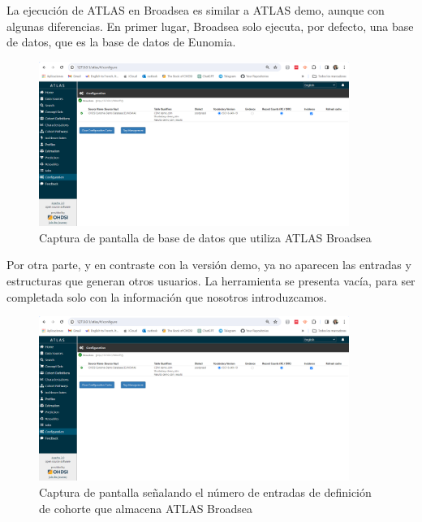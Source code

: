 \begin{enumerate}
    La ejecución de ATLAS en Broadsea es similar a ATLAS demo, aunque con algunas diferencias. En primer lugar, Broadsea solo ejecuta, por defecto, una base de datos, que es la base de datos de Eunomia.

\begin{figure}[H]
    \centering
    \includegraphics[width=0.90\textwidth]{figures/atlasBroadseaDB.png}
     \caption{Captura de pantalla de base de datos que utiliza ATLAS Broadsea}
    \label{fig:atlasBroadseaDB}
\end{figure}

    Por otra parte, y en contraste con la versión demo, ya no aparecen las entradas y estructuras que generan otros usuarios. La herramienta se presenta vacía, para ser completada solo con la información que nosotros introduzcamos.

\begin{figure}[H]
    \centering
    \includegraphics[width=0.90\textwidth]{figures/atlasBroadseaDB.png}
     \caption{Captura de pantalla señalando el número de entradas de definición de cohorte que almacena ATLAS Broadsea}
    \label{fig:atlasBroadseaDB}
\end{figure}
    
\end{enumerate}

